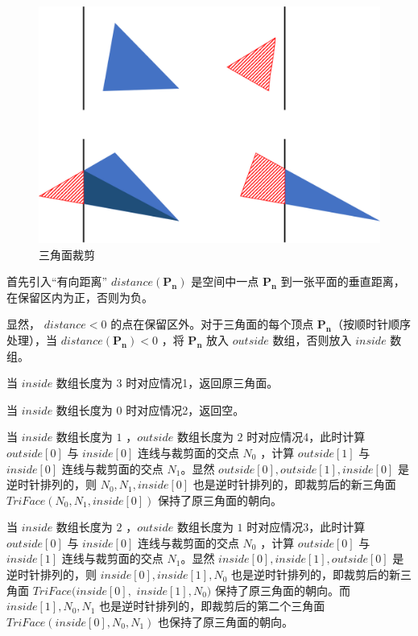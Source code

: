 \documentclass[12pt,oneside,a4paper]{ctexart}
\begin{document}
\begin{figure}[H]
	\centering
	\includegraphics[scale=0.5]{Picture/Cuts.png}
	\vspace{-2ex}
	\caption{三角面裁剪}
	\label{Cuts}
\end{figure}

首先引入“有向距离” $distance(\mathbf{P_n})$ 是空间中一点 $\mathbf{P_n}$ 到一张平面的垂直距离，在保留区内为正，否则为负。

显然， $distance<0$ 的点在保留区外。对于三角面的每个顶点 $\mathbf{P_n}$（按顺时针顺序处理），当 $distance(\mathbf{P_n}) < 0$ ，将 $\mathbf{P_n}$ 放入 $outside$ 数组，否则放入 $inside$ 数组。

当 $inside$ 数组长度为 $3$ 时对应情况1，返回原三角面。

当 $inside$ 数组长度为 $0$ 时对应情况2，返回空。

当 $inside$ 数组长度为 $1$ ，$outside$ 数组长度为 $2$ 时对应情况4，此时计算 $outside[0]$ 与 $inside[0]$ 连线与裁剪面的交点 $N_0$ ，计算 $outside[1]$ 与 $inside[0]$ 连线与裁剪面的交点 $N_1$。显然 $outside[0], outside[1], inside[0]$ 是逆时针排列的，则 $N_0, N_1, inside[0]$ 也是逆时针排列的，即裁剪后的新三角面 $TriFace(N_0, N_1, inside[0])$ 保持了原三角面的朝向。

当 $inside$ 数组长度为 $2$ ，$outside$ 数组长度为 $1$ 时对应情况3，此时计算 $outside[0]$ 与 $inside[0]$ 连线与裁剪面的交点 $N_0$ ，计算 $outside[0]$ 与 $inside[1]$ 连线与裁剪面的交点 $N_1$。显然 $inside[0], inside[1], outside[0]$ 是逆时针排列的，则 $inside[0], inside[1], N_0$ 也是逆时针排列的，即裁剪后的新三角面 $TriFace(inside[0], $
$inside[1], N_0)$ 保持了原三角面的朝向。而 $inside[1], N_0, N_1$ 也是逆时针排列的，即裁剪后的第二个三角面 $TriFace(inside[0], N_0, N_1)$ 也保持了原三角面的朝向。
\end{document}
